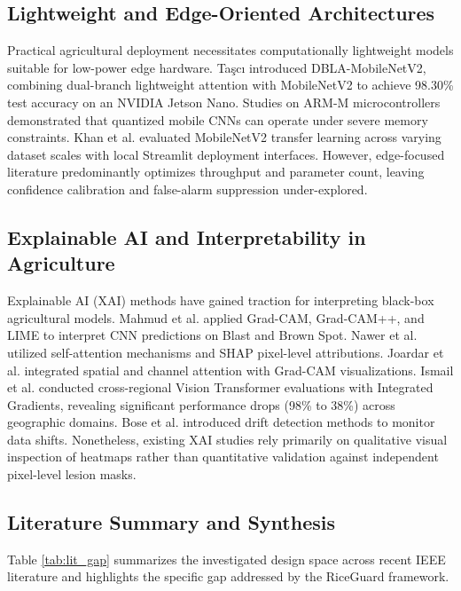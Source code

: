 \subsection{Lightweight and Edge-Oriented Architectures}
Practical agricultural deployment necessitates computationally lightweight models suitable for low-power edge hardware. Ta{\c{s}}c{\i} \cite{ref3} introduced DBLA-MobileNetV2, combining dual-branch lightweight attention with MobileNetV2 to achieve 98.30\% test accuracy on an NVIDIA Jetson Nano. Studies on ARM-M microcontrollers \cite{ref14} demonstrated that quantized mobile CNNs can operate under severe memory constraints. Khan et al. \cite{ref9} evaluated MobileNetV2 transfer learning across varying dataset scales with local Streamlit deployment interfaces. However, edge-focused literature predominantly optimizes throughput and parameter count, leaving confidence calibration and false-alarm suppression under-explored.

\subsection{Explainable AI and Interpretability in Agriculture}
Explainable AI (XAI) methods have gained traction for interpreting black-box agricultural models. Mahmud et al. \cite{ref4} applied Grad-CAM, Grad-CAM++, and LIME to interpret CNN predictions on Blast and Brown Spot. Nawer et al. \cite{ref5} utilized self-attention mechanisms and SHAP pixel-level attributions. Joardar et al. \cite{ref7} integrated spatial and channel attention with Grad-CAM visualizations. Ismail et al. \cite{ref6} conducted cross-regional Vision Transformer evaluations with Integrated Gradients, revealing significant performance drops (98\% to 38\%) across geographic domains. Bose et al. \cite{ref8} introduced drift detection methods to monitor data shifts. Nonetheless, existing XAI studies rely primarily on qualitative visual inspection of heatmaps rather than quantitative validation against independent pixel-level lesion masks.

\subsection{Literature Summary and Synthesis}
Table \ref{tab:lit_gap} summarizes the investigated design space across recent IEEE literature and highlights the specific gap addressed by the RiceGuard framework.

